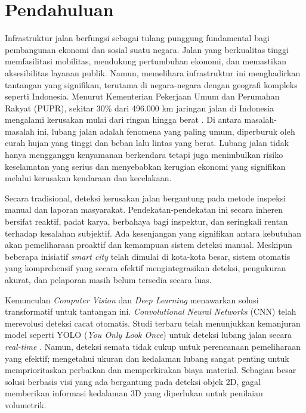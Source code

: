 \documentclass{iopjournal}
\begin{document}
\section{Pendahuluan}
\label{sec:introduction}

Infrastruktur jalan berfungsi sebagai tulang punggung fundamental bagi pembangunan ekonomi dan sosial suatu negara. Jalan yang berkualitas tinggi memfasilitasi mobilitas, mendukung pertumbuhan ekonomi, dan memastikan aksesibilitas layanan publik. Namun, memelihara infrastruktur ini menghadirkan tantangan yang signifikan, terutama di negara-negara dengan geografi kompleks seperti Indonesia. Menurut Kementerian Pekerjaan Umum dan Perumahan Rakyat (PUPR), sekitar 30\% dari 496.000 km jaringan jalan di Indonesia mengalami kerusakan mulai dari ringan hingga berat \cite{kemenpupr}. Di antara masalah-masalah ini, lubang jalan adalah fenomena yang paling umum, diperburuk oleh curah hujan yang tinggi dan beban lalu lintas yang berat. Lubang jalan tidak hanya mengganggu kenyamanan berkendara tetapi juga menimbulkan risiko keselamatan yang serius dan menyebabkan kerugian ekonomi yang signifikan melalui kerusakan kendaraan dan kecelakaan.

Secara tradisional, deteksi kerusakan jalan bergantung pada metode inspeksi manual dan laporan masyarakat. Pendekatan-pendekatan ini secara inheren bersifat reaktif, padat karya, berbahaya bagi inspektur, dan seringkali rentan terhadap kesalahan subjektif. Ada kesenjangan yang signifikan antara kebutuhan akan pemeliharaan proaktif dan kemampuan sistem deteksi manual. Meskipun beberapa inisiatif \textit{smart city} telah dimulai di kota-kota besar, sistem otomatis yang komprehensif yang secara efektif mengintegrasikan deteksi, pengukuran akurat, dan pelaporan masih belum tersedia secara luas.

Kemunculan \textit{Computer Vision} dan \textit{Deep Learning} menawarkan solusi transformatif untuk tantangan ini. \textit{Convolutional Neural Networks} (CNN) telah merevolusi deteksi cacat otomatis. Studi terbaru telah menunjukkan kemanjuran model seperti YOLO (\textit{You Only Look Once}) untuk deteksi lubang jalan secara \textit{real-time} \cite{gorro2024}. Namun, deteksi semata tidak cukup untuk perencanaan pemeliharaan yang efektif; mengetahui ukuran dan kedalaman lubang sangat penting untuk memprioritaskan perbaikan dan memperkirakan biaya material. Sebagian besar solusi berbasis visi yang ada bergantung pada deteksi objek 2D, gagal memberikan informasi kedalaman 3D yang diperlukan untuk penilaian volumetrik.
\end{document}
